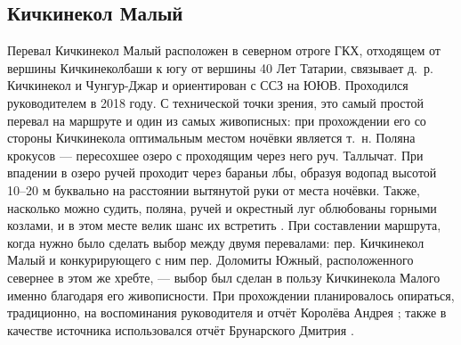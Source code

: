 \subsection{Кичкинекол Малый} 
Перевал Кичкинекол Малый расположен  в северном отроге ГКХ, отходящем от вершины Кичкинеколбаши к югу от вершины 40 Лет Татарии, связывает д.~р. Кичкинекол и Чунгур-Джар и ориентирован с ССЗ на ЮЮВ. Проходился руководителем в 2018 году. С технической точки зрения, это самый простой перевал на маршруте и один из самых живописных: при прохождении его со стороны Кичкинекола оптимальным местом ночёвки является т.~н. Поляна крокусов --- пересохшее озеро с проходящим через него руч. Таллычат. При впадении в озеро ручей проходит через бараньи лбы, образуя водопад высотой 10--20 м буквально на расстоянии вытянутой руки от места ночёвки. Также, насколько можно судить, поляна, ручей и окрестный луг облюбованы горными козлами, и в этом месте велик шанс их встретить \cite{Korolyov2018}. При составлении маршрута, когда нужно было сделать выбор между двумя перевалами: пер. Кичкинекол Малый и конкурирующего с ним пер. Доломиты Южный, расположенного севернее в этом же хребте, --- выбор был сделан в пользу Кичкинекола Малого именно благодаря его живописности. При прохождении планировалось опираться, традиционно, на воспоминания руководителя и отчёт Королёва Андрея \cite{Korolyov2018}; также в качестве источника использовался отчёт Брунарского Дмитрия \cite{Brunarsky2023}. 